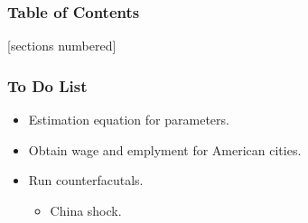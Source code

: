 \documentclass[serif, 9pt, aspectratio=32]{beamer}
\begin{document}
\begin{frame}
    \frametitle{Table of Contents}
    [sections numbered]
    \tableofcontents[currentsection]
\end{frame}

\begin{frame}
    \centering
    \frametitle{To Do List}
    \begin{itemize}
        \setlength{\itemsep}{3em}
        \item Estimation equation for parameters.
        \item Obtain wage and emplyment for American cities.
        \item Run counterfacutals.
              \begin{itemize}
                  \item China shock.
              \end{itemize}
    \end{itemize}
\end{frame}
\end{document}
